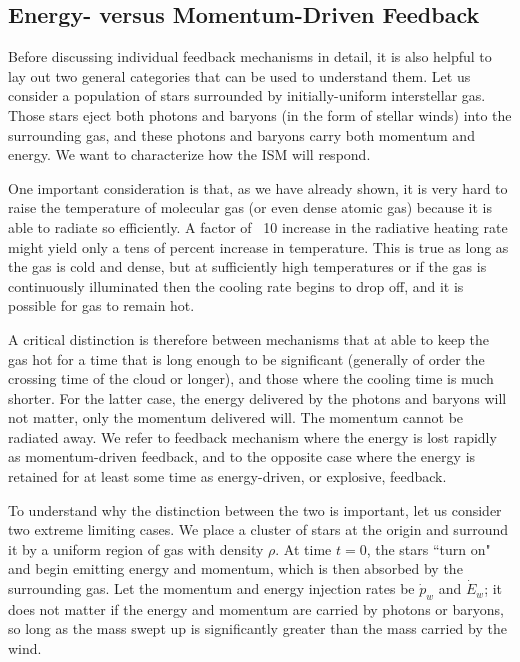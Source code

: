 \subsection{Energy- versus Momentum-Driven Feedback}

Before discussing individual feedback mechanisms in detail, it is also helpful to lay out two general categories that can be used to understand them. Let us consider a population of stars surrounded by initially-uniform interstellar gas. Those stars eject both photons and baryons (in the form of stellar winds) into the surrounding gas, and these photons and baryons carry both momentum and energy. We want to characterize how the ISM will respond.

One important consideration is that, as we have already shown, it is very hard to raise the temperature of molecular gas (or even dense atomic gas) because it is able to radiate so efficiently. A factor of ~10 increase in the radiative heating rate might yield only a tens of percent increase in temperature. This is true as long as the gas is cold and dense, but at sufficiently high temperatures or if the gas is continuously illuminated then the cooling rate begins to drop off, and it is possible for gas to remain hot.

A critical distinction is therefore between mechanisms that at able to keep the gas hot for a time that is long enough to be significant (generally of order the crossing time of the cloud or longer), and those where the cooling time is much shorter. For the latter case, the energy delivered by the photons and baryons will not matter, only the momentum delivered will. The momentum cannot be radiated away. We refer to feedback mechanism where the energy is lost rapidly as momentum-driven feedback, and to the opposite case where the energy is retained for at least some time as energy-driven, or explosive, feedback.

To understand why the distinction between the two is important, let us consider two extreme limiting cases. We place a cluster of stars at the origin and surround it by a uniform region of gas with density $\rho$. At time $t=0$, the stars ``turn on" and begin emitting energy and momentum, which is then absorbed by the surrounding gas. Let the momentum and energy injection rates be $\dot{p}_w$ and $\dot{E}_w$; it does not matter if the energy and momentum are carried by photons or baryons, so long as the mass swept up is significantly greater than the mass carried by the wind.


